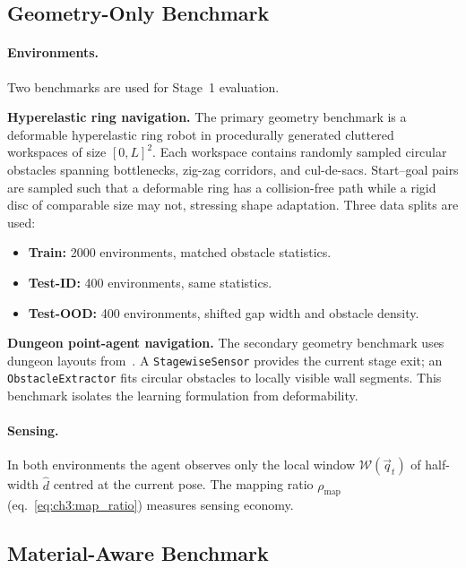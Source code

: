 \subsection{Geometry-Only Benchmark}
\label{subsec:ch6:geom_bench}

\paragraph{Environments.}
Two benchmarks are used for Stage~1 evaluation.

\textbf{Hyperelastic ring navigation.}
The primary geometry benchmark is a deformable hyperelastic ring robot
in procedurally generated cluttered workspaces of size $[0,L]^2$.
Each workspace contains randomly sampled circular obstacles spanning
bottlenecks, zig-zag corridors, and cul-de-sacs.
Start–goal pairs are sampled such that a deformable ring has a
collision-free path while a rigid disc of comparable size may not,
stressing shape adaptation.
Three data splits are used:
\begin{itemize}
  \item \textbf{Train:} 2000 environments, matched obstacle statistics.
  \item \textbf{Test-ID:} 400 environments, same statistics.
  \item \textbf{Test-OOD:} 400 environments, shifted gap width and
        obstacle density.
\end{itemize}

\textbf{Dungeon point-agent navigation.}
The secondary geometry benchmark uses dungeon layouts from~\citet{liang2023context}.
A \texttt{StagewiseSensor} provides the current stage exit; an
\texttt{ObstacleExtractor} fits circular obstacles to locally visible
wall segments.
This benchmark isolates the learning formulation from deformability.

\paragraph{Sensing.}
In both environments the agent observes only the local window
$\mathcal{W}(\vec{q}_t)$ of half-width $\hat{d}$ centred at the
current pose.
The mapping ratio $\rho_{\mathrm{map}}$ (eq.~\eqref{eq:ch3:map_ratio})
measures sensing economy.

\subsection{Material-Aware Benchmark}
\label{subsec:ch6:mat_bench}


